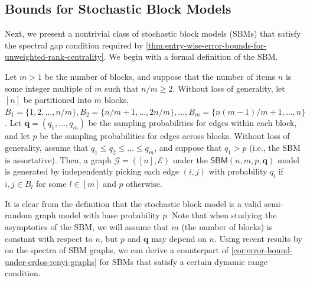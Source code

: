 \documentclass[sigconf,nonacm,pbalance]{acmart}
\begin{document}
\subsection{Bounds for Stochastic Block Models}\label{subsec:sbm}
Next, we present a nontrivial class of stochastic block models (SBMs) that satisfy the spectral gap condition required by \cref{thm:entry-wise-error-bounds-for-unweighted-rank-centrality}. We begin with a formal definition of the SBM.
\begin{definition}
Let $m>1$ be the number of blocks, and suppose that the number of items $n$ is some integer multiple of $m$ such that $n/m\geq 2$. Without loss of generality, let $[n]$ be partitioned into $m$ blocks, $B_1=\{1,2,\dots,n/m\},B_2=\{n/m+1,\dots,2n/m\},\dots,\allowbreak B_m=\{n(m-1)/m+1,\dots,n\}$. Let $\bm{q}=(q_1,\dots,q_m)$ be the sampling probabilities for edges within each block, and let $p$ be the sampling probabilities for edges across blocks. Without loss of generality, assume that $q_1 \leq q_2 \leq \dots \leq q_m$, and suppose that $q_1>p$ (i.e., the SBM is assortative). Then, a graph $\mathcal{G}=([n],\mathcal{E})$ under the $\mathsf{SBM}(n,m,p,\bm{q})$ model is generated by independently picking each edge $(i, j)$ with probability $q_l$ if $i, j \in B_l$ for some $l \in [m]$ and $p$ otherwise.
\end{definition}

It is clear from the definition that the stochastic block model is a valid semi-random graph model with base probability $p$. Note that when studying the asymptotics of the SBM, we will assume that $m$ (the number of blocks) is constant with respect to $n$, but $p$ and $\bm{q}$ may depend on $n$. Using recent results by \cite{LoweTerveer2025} on the spectra of SBM graphs, we can derive a counterpart of \cref{cor:error-bound-under-erdos-renyi-graphs} for SBMs that satisfy a certain dynamic range condition.
\end{document}
